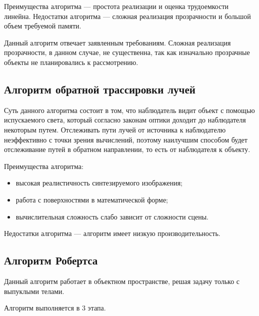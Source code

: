 Преимущества алгоритма --- простота реализации и оценка трудоемкости линейна.
Недостатки алгоритма --- сложная реализация прозрачности и большой объем требуемой памяти.

Данный алгоритм отвечает заявленным требованиям. Сложная реализация прозрачности, в данном случае, не существенна, так как изначально прозрачные объекты не планировались к рассмотрению.

\subsection{Алгоритм обратной трассировки лучей}

Суть данного алгоритма состоит в том, что наблюдатель видит объект с помощью испускаемого света, который согласно законам оптики доходит до наблюдателя некоторым путем. Отслеживать пути лучей от источника к наблюдателю неэффективно с точки зрения вычислений, поэтому наилучшим способом будет отслеживание путей в обратном направлении, то есть от наблюдателя к объекту.

Преимущества алгоритма:
\begin{itemize}
	\item высокая реалистичность синтезируемого изображения;
	\item работа с поверхностями в математической форме;
	\item вычислительная сложность слабо зависит от сложности сцены.
\end{itemize}

Недостатки алгоритма --- алгоритм имеет низкую производительность.

\subsection{Алгоритм Робертса}

Данный алгоритм работает в объектном пространстве, решая задачу только с выпуклыми телами.

Алгоритм выполняется в 3 этапа.

